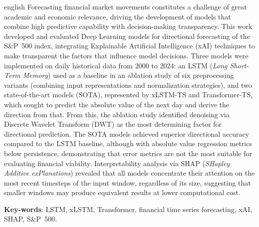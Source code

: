 \begin{resumo}[Abstract]
 \begin{otherlanguage*}{english}
   Forecasting financial market movements constitutes a challenge of great academic and economic relevance, driving the development of models that combine high predictive capability with decision-making transparency. This work developed and evaluated Deep Learning models for directional forecasting of the S\&P~500 index, integrating Explainable Artificial Intelligence (xAI) techniques to make transparent the factors that influence model decisions. Three models were implemented on daily historical data from 2000 to 2024: an LSTM (\textit{Long Short-Term Memory}) used as a baseline in an ablation study of six preprocessing variants (combining input representations and normalization strategies), and two state-of-the-art models (SOTA), represented by xLSTM-TS and Transformer-TS, which sought to predict the absolute value of the next day and derive the direction from that. From this, the ablation study identified denoising via Discrete Wavelet Transform (DWT) as the most determining factor for directional prediction. The SOTA models achieved superior directional accuracy compared to the LSTM baseline, although with absolute value regression metrics below persistence, demonstrating that error metrics are not the most suitable for evaluating financial viability. Interpretability analysis via SHAP (\textit{SHapley Additive exPlanations}) revealed that all models concentrate their attention on the most recent timesteps of the input window, regardless of its size, suggesting that smaller windows may produce equivalent results at lower computational cost.

   \vspace{\onelineskip}
 
   \noindent 
   \textbf{Key-words}: LSTM, xLSTM, Transformer, financial time series forecasting, xAI, SHAP, S\&P~500.
 \end{otherlanguage*}
\end{resumo}
